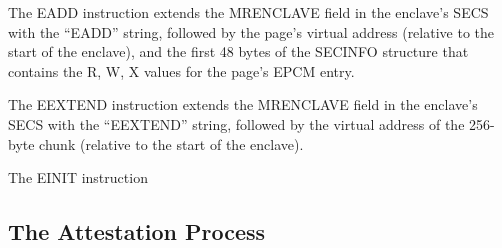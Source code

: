 
The EADD instruction extends the MRENCLAVE field in the enclave's SECS with the
``EADD'' string, followed by the page's virtual address (relative to the start
of the enclave), and the first 48 bytes of the SECINFO structure that contains
the R, W, X values for the page's EPCM entry.

\begin{table}[hbt]
  \caption{
    Data extended into MRENCLAVE by the EADD instruction.
  }
  \label{fig:eadd_mrenclave}
\end{table}


The EEXTEND instruction extends the MRENCLAVE field in the enclave's SECS with
the ``EEXTEND'' string, followed by the virtual address of the 256-byte chunk
(relative to the start of the enclave).

\begin{table}[hbt]
  \caption{
    Data extended into MRENCLAVE by the EEXTEND instruction.
  }
  \label{fig:eextend_mrenclave}
\end{table}


The EINIT instruction

\subsection{The Attestation Process}








